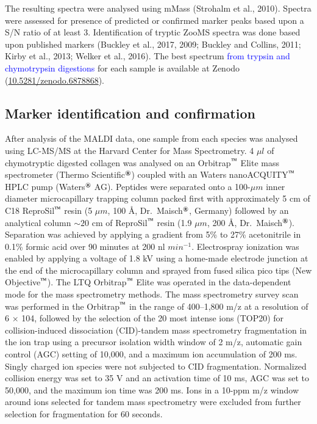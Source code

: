 \documentclass[preprint, 3p, authoryear]{elsarticle} %
\begin{document}
The resulting spectra were analysed using mMass (Strohalm et al., 2010). Spectra were assessed for presence of predicted or confirmed marker peaks based upon a S/N ratio of at least 3. Identification of tryptic ZooMS spectra was done based upon published markers (Buckley et al., 2017, 2009; Buckley and Collins, 2011; Kirby et al., 2013; Welker et al., 2016). The best spectrum \textcolor{blue}{from trypsin and chymotrypsin digestions} for each sample is available at Zenodo (\href{https://doi.org/doi:10.5281/zenodo.6878868}{10.5281/zenodo.6878868}).

\hypertarget{marker-identification-and-confirmation}{%
\subsection{Marker identification and confirmation}\label{marker-identification-and-confirmation}}

After analysis of the MALDI data, one sample from each species was analysed using LC-MS/MS at the Harvard Center for Mass Spectrometry. 4 \(\mu l\) of chymotryptic digested collagen was analysed on an Orbitrap\(^\text{\texttrademark}\) Elite mass spectrometer (Thermo Scientific\(^\text{\textregistered}\)) coupled with an Waters nanoACQUITY\(^\text{\texttrademark}\) HPLC pump (Waters\(^\text{\textregistered}\) AG). Peptides were separated onto a 100-\(\mu m\) inner diameter microcapillary trapping column packed first with approximately 5 cm of C18 ReproSil\(^\text{\texttrademark}\) resin (5 \(\mu m\), 100 Å, Dr.~Maisch\(^\text{\textregistered}\), Germany) followed by an analytical column \(\sim 20\) cm of ReproSil\(^\text{\texttrademark}\) resin (1.9 \(\mu m\), 200 Å, Dr.~Maisch\(^\text{\textregistered}\)). Separation was achieved by applying a gradient from 5\% to 27\% acetonitrile in 0.1\% formic acid over 90 minutes at 200 nl \(min ^{-1}\). Electrospray ionization was enabled by applying a voltage of 1.8 kV using a home-made electrode junction at the end of the microcapillary column and sprayed from fused silica pico tips (New Objective\(^\text{\texttrademark}\)). The LTQ Orbitrap\(^\text{\texttrademark}\) Elite was operated in the data-dependent mode for the mass spectrometry methods. The mass spectrometry survey scan was performed in the Orbitrap\(^\text{\texttrademark}\) in the range of 400--1,800 m/z at a resolution of 6 × 104, followed by the selection of the 20 most intense ions (TOP20) for collision-induced dissociation (CID)-tandem mass spectrometry fragmentation in the ion trap using a precursor isolation width window of 2 m/z, automatic gain control (AGC) setting of 10,000, and a maximum ion accumulation of 200 ms. Singly charged ion species were not subjected to CID fragmentation. Normalized collision energy was set to 35 V and an activation time of 10 ms, AGC was set to 50,000, and the maximum ion time was 200 ms. Ions in a 10-ppm m/z window around ions selected for tandem mass spectrometry were excluded from further selection for fragmentation for 60 seconds.
\end{document}
